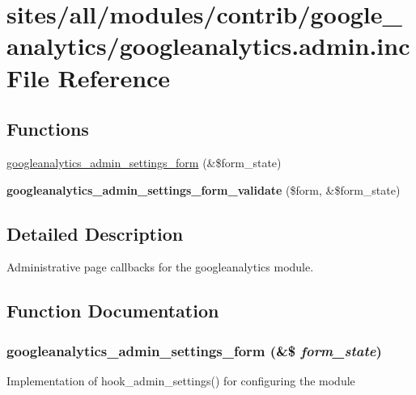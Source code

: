 \hypertarget{googleanalytics_8admin_8inc}{
\section{sites/all/modules/contrib/google\_\-analytics/googleanalytics.admin.inc File Reference}
\label{googleanalytics_8admin_8inc}
}
\subsection*{Functions}
\begin{CompactItemize}
\item 
\hyperlink{googleanalytics_8admin_8inc_b7b5a85213e808c75dfe497f53bd6851}{googleanalytics\_\-admin\_\-settings\_\-form} (\&\$form\_\-state)
\item 
\hypertarget{googleanalytics_8admin_8inc_41b564fb7aed5ae2811eddf2955eb13e}{
\textbf{googleanalytics\_\-admin\_\-settings\_\-form\_\-validate} (\$form, \&\$form\_\-state)}
\label{googleanalytics_8admin_8inc_41b564fb7aed5ae2811eddf2955eb13e}

\end{CompactItemize}


\subsection{Detailed Description}
Administrative page callbacks for the googleanalytics module. 

\subsection{Function Documentation}
\hypertarget{googleanalytics_8admin_8inc_b7b5a85213e808c75dfe497f53bd6851}{
\subsubsection[{googleanalytics\_\-admin\_\-settings\_\-form}]{\setlength{\rightskip}{0pt plus 5cm}googleanalytics\_\-admin\_\-settings\_\-form (\&\$ {\em form\_\-state})}}
\label{googleanalytics_8admin_8inc_b7b5a85213e808c75dfe497f53bd6851}


Implementation of hook\_\-admin\_\-settings() for configuring the module 